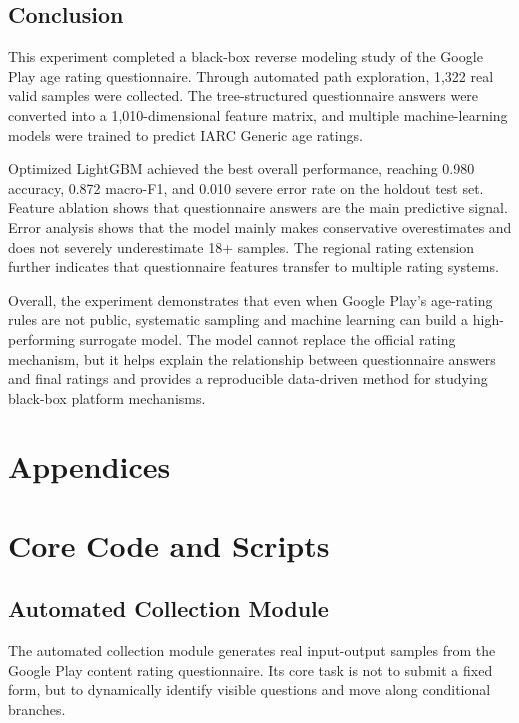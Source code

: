 \documentclass[UTF8,a4paper,12pt]{ctexart}
\begin{document}
\subsection{Conclusion}\label{conclusion}

This experiment completed a black-box reverse modeling study of the Google Play age rating questionnaire. Through automated path exploration, 1,322 real valid samples were collected. The tree-structured questionnaire answers were converted into a 1,010-dimensional feature matrix, and multiple machine-learning models were trained to predict IARC Generic age ratings.

Optimized LightGBM achieved the best overall performance, reaching 0.980 accuracy, 0.872 macro-F1, and 0.010 severe error rate on the holdout test set. Feature ablation shows that questionnaire answers are the main predictive signal. Error analysis shows that the model mainly makes conservative overestimates and does not severely underestimate 18+ samples. The regional rating extension further indicates that questionnaire features transfer to multiple rating systems.

Overall, the experiment demonstrates that even when Google Play's age-rating rules are not public, systematic sampling and machine learning can build a high-performing surrogate model. The model cannot replace the official rating mechanism, but it helps explain the relationship between questionnaire answers and final ratings and provides a reproducible data-driven method for studying black-box platform mechanisms.

\clearpage
{}
\section*{Appendices}

\appendix

\section{Core Code and Scripts}\label{core-code-and-scripts}

\subsection{Automated Collection Module}\label{automated-collection-module}

The automated collection module generates real input-output samples from the Google Play content rating questionnaire. Its core task is not to submit a fixed form, but to dynamically identify visible questions and move along conditional branches.
\end{document}
